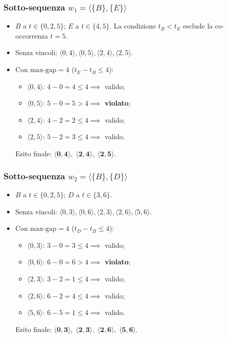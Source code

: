 \subsubsection{Sotto-sequenza \texorpdfstring{$w_1 = \langle \{B\}, \{E\} \rangle$}{w1}}
\begin{itemize}
    \item $B$ a $t \in \{0, 2, 5\}$; $E$ a $t \in \{4, 5\}$. La condizione $t_B < t_E$ esclude la co-occorrenza $t=5$.
    \item Senza vincoli: $\langle 0, 4 \rangle, \langle 0, 5 \rangle, \langle 2, 4 \rangle, \langle 2, 5 \rangle$.
    \item Con $\text{max-gap} = 4$ ($t_E - t_B \le 4$):
    \begin{itemize}
        \item $\langle 0, 4 \rangle$: $4 - 0 = 4 \le 4 \implies$ valido;
        \item $\langle 0, 5 \rangle$: $5 - 0 = 5 > 4 \implies$ \textbf{violato};
        \item $\langle 2, 4 \rangle$: $4 - 2 = 2 \le 4 \implies$ valido;
        \item $\langle 2, 5 \rangle$: $5 - 2 = 3 \le 4 \implies$ valido.
    \end{itemize}
    Esito finale: $\mathbf{\langle 0, 4 \rangle, \; \langle 2, 4 \rangle, \; \langle 2, 5 \rangle}$.
\end{itemize}

\FloatBarrier
\subsubsection{Sotto-sequenza \texorpdfstring{$w_2 = \langle \{B\}, \{D\} \rangle$}{w2}}
\begin{itemize}
    \item $B$ a $t \in \{0, 2, 5\}$; $D$ a $t \in \{3, 6\}$.
    \item Senza vincoli: $\langle 0, 3 \rangle, \langle 0, 6 \rangle, \langle 2, 3 \rangle, \langle 2, 6 \rangle, \langle 5, 6 \rangle$.
    \item Con $\text{max-gap} = 4$ ($t_D - t_B \le 4$):
    \begin{itemize}
        \item $\langle 0, 3 \rangle$: $3 - 0 = 3 \le 4 \implies$ valido;
        \item $\langle 0, 6 \rangle$: $6 - 0 = 6 > 4 \implies$ \textbf{violato};
        \item $\langle 2, 3 \rangle$: $3 - 2 = 1 \le 4 \implies$ valido;
        \item $\langle 2, 6 \rangle$: $6 - 2 = 4 \le 4 \implies$ valido;
        \item $\langle 5, 6 \rangle$: $6 - 5 = 1 \le 4 \implies$ valido.
    \end{itemize}
    Esito finale: $\mathbf{\langle 0, 3 \rangle, \; \langle 2, 3 \rangle, \; \langle 2, 6 \rangle, \; \langle 5, 6 \rangle}$.
\end{itemize}


